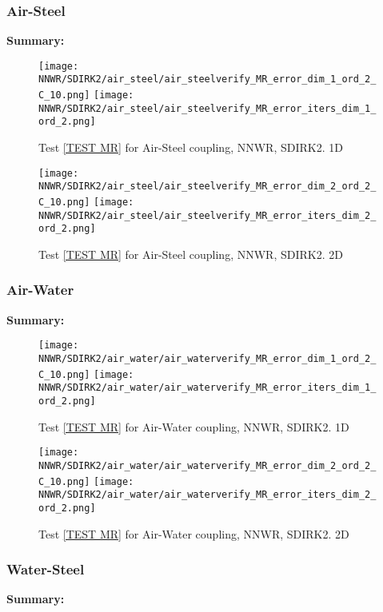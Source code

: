 \documentclass[a4paper,10pt]{article}
\begin{document}
\FloatBarrier
\subsubsection{Air-Steel}\label{SEC NNWR SDIRK2 AIR STEEL}
%
\textbf{Summary:} 

\begin{figure}[!ht]
\texttt{[image: NNWR/SDIRK2/air\_steel/air\_steelverify\_MR\_error\_dim\_1\_ord\_2\_C\_10.png]}
\texttt{[image: NNWR/SDIRK2/air\_steel/air\_steelverify\_MR\_error\_iters\_dim\_1\_ord\_2.png]}
\caption{Test \ref{TEST MR} for Air-Steel coupling, NNWR, SDIRK2. 1D}
\label{FIG NNWR SDIRK2 AIR STEEL 1D}
\end{figure}

\begin{figure}[!ht]
\texttt{[image: NNWR/SDIRK2/air\_steel/air\_steelverify\_MR\_error\_dim\_2\_ord\_2\_C\_10.png]}
\texttt{[image: NNWR/SDIRK2/air\_steel/air\_steelverify\_MR\_error\_iters\_dim\_2\_ord\_2.png]}
\caption{Test \ref{TEST MR} for Air-Steel coupling, NNWR, SDIRK2. 2D}
\label{FIG NNWR SDIRK2 AIR STEEL 2D}
\end{figure}

\FloatBarrier
\subsubsection{Air-Water}\label{SEC NNWR SDIRK2 AIR WATER}
% 
\textbf{Summary:} 

\begin{figure}[!ht]
\texttt{[image: NNWR/SDIRK2/air\_water/air\_waterverify\_MR\_error\_dim\_1\_ord\_2\_C\_10.png]}
\texttt{[image: NNWR/SDIRK2/air\_water/air\_waterverify\_MR\_error\_iters\_dim\_1\_ord\_2.png]}
\caption{Test \ref{TEST MR} for Air-Water coupling, NNWR, SDIRK2. 1D}
\label{FIG NNWR SDIRK2 AIR WATER 1D}
\end{figure}

\begin{figure}[!ht]
\texttt{[image: NNWR/SDIRK2/air\_water/air\_waterverify\_MR\_error\_dim\_2\_ord\_2\_C\_10.png]}
\texttt{[image: NNWR/SDIRK2/air\_water/air\_waterverify\_MR\_error\_iters\_dim\_2\_ord\_2.png]}
\caption{Test \ref{TEST MR} for Air-Water coupling, NNWR, SDIRK2. 2D}
\label{FIG NNWR SDIRK2 AIR WATER 2D}
\end{figure}

\FloatBarrier
\subsubsection{Water-Steel}\label{SEC NNWR SDIRK2 WATER STEEL}
% 
\textbf{Summary:} 
\end{document}
